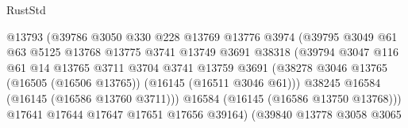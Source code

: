 \begin{lexlean}{RustStd}
\begin{coremodule}
                                        @13793
                                        (@39786
                                          @3050
                                          @330
                                          @228
                                          @13769
                                          @13776
                                          @3974
                                          (@39795
                                            @3049
                                            @61
                                            @63
                                            @5125
                                            @13768
                                            @13775
                                            @3741
                                            @13749
                                            @3691
                                            @38318
                                            (@39794
                                              @3047
                                              @116
                                              @61
                                              @14
                                              @13765
                                              @3711
                                              @3704
                                              @3741
                                              @13759
                                              @3691
                                              (@38278
                                                @3046
                                                @13765
                                                (@16505 (@16506 @13765))
                                                (@16145 (@16511 @3046 @61)))
                                              @38245
                                              @16584
                                              (@16145 (@16586 @13760 @3711)))
                                            @16584
                                            (@16145 (@16586 @13750 @13768)))
                                          @17641
                                          @17644
                                          @17647
                                          @17651
                                          @17656
                                          @39164)
                                        (@39840
                                          @13778
                                          @3058
                                          @3065

\end{coremodule}
\end{lexlean}
